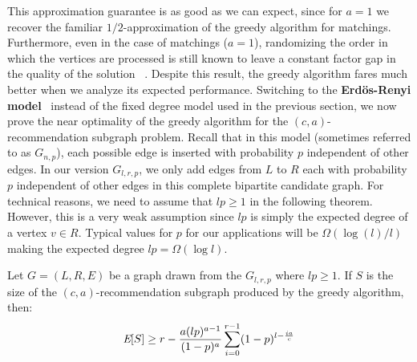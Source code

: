 This approximation guarantee is as good as we can expect,
since for $a=1$ we recover the familiar $1/2$-approximation
of the greedy algorithm for matchings. Furthermore, even in the case of matchings ($a=1$),
randomizing the order in which the vertices are processed is still
known to leave a constant factor gap in the quality of the solution
~\cite{KarpVaziraniVazirani1990}. Despite this result, the greedy
algorithm fares much better when we analyze its expected performance.
Switching to the
{\bf Erd\"{o}s-Renyi model}~\cite{ErdosRenyi59} instead of the fixed degree model used in
the previous section, we now prove the near optimality of the
greedy algorithm for the $(c, a)$-recommendation subgraph problem.
Recall that in this model (sometimes referred to as $G_{n,p}$), each possible edge is inserted with probability $p$ independent of other edges. In our version $G_{l,r,p}$, we only add edges from $L$ to $R$ each with probability $p$ independent of other edges in this complete bipartite candidate graph.  For technical reasons, we need to assume that $lp \geq 1$ in the following theorem. However, this is a very weak assumption since $lp$ is simply the expected degree of a vertex $v\in R$. Typical values for $p$ for our applications will be $\Omega(\log(l)/l)$ making the expected degree $lp=\Omega(\log l)$.

\begin{thm}\label{greed-is-good}
Let $G=(L,R,E)$ be a graph drawn from the $G_{l,r,p}$ where $lp \geq 1$. If $S$ is the size of the $(c,a)$-recommendation subgraph produced by the greedy algorithm, then:
\[ \emph{\text{E}}[S] \geq r - \frac{a(lp)^{a-1}}{(1-p)^a} \sum_{i=0}^{r-1}(1-p)^{l-\frac{ia}{c}}\]
\end{thm}

